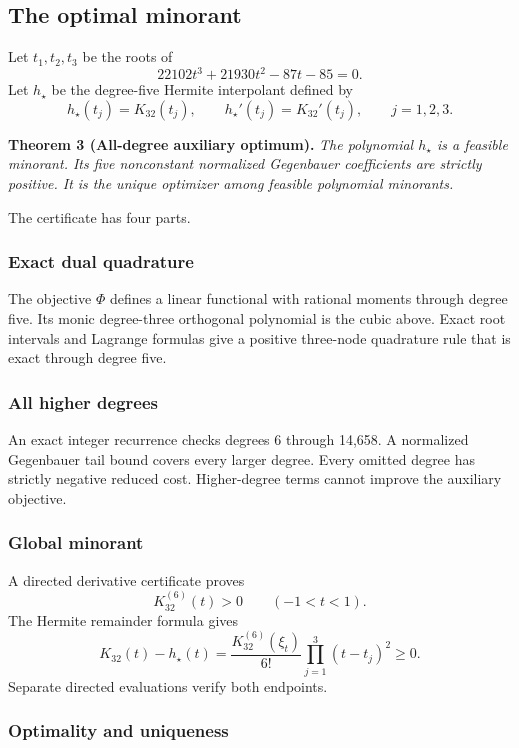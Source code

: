 \documentclass[11pt]{article}
\begin{document}
\subsection{The optimal minorant}\label{the-optimal-minorant}

Let \(t_1,t_2,t_3\) be the roots of
\[
22102t^3+21930t^2-87t-85=0.
\]
Let \(h_\star\) be the degree-five Hermite interpolant defined by
\[
h_\star(t_j)=K_{32}(t_j),
\qquad
h_\star'(t_j)=K_{32}'(t_j),
\qquad j=1,2,3.
\]

\textbf{Theorem 3 (All-degree auxiliary optimum).}
\emph{The polynomial \(h_\star\) is a feasible minorant. Its five
nonconstant normalized Gegenbauer coefficients are strictly positive. It
is the unique optimizer among feasible polynomial minorants.}

The certificate has four parts.

\subsubsection{Exact dual quadrature}\label{exact-dual-quadrature}

The objective \(\Phi\) defines a linear functional with rational moments
through degree five. Its monic degree-three orthogonal polynomial is the
cubic above. Exact root intervals and Lagrange formulas give a positive
three-node quadrature rule that is exact through degree five.

\subsubsection{All higher degrees}\label{all-higher-degrees}

An exact integer recurrence checks degrees 6 through 14,658. A normalized
Gegenbauer tail bound covers every larger degree. Every omitted degree has
strictly negative reduced cost. Higher-degree terms cannot improve the
auxiliary objective.

\subsubsection{Global minorant}\label{global-minorant}

A directed derivative certificate proves
\[
K_{32}^{(6)}(t)>0
\qquad (-1<t<1).
\]
The Hermite remainder formula gives
\[
K_{32}(t)-h_\star(t)
=\frac{K_{32}^{(6)}(\xi_t)}{6!}
\prod_{j=1}^{3}(t-t_j)^2
\geq0.
\]
Separate directed evaluations verify both endpoints.

\subsubsection{Optimality and uniqueness}\label{optimality-and-uniqueness}
\end{document}
